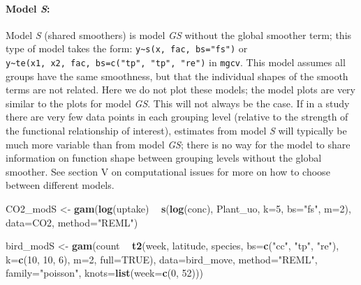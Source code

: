 \documentclass[12pt]{article}
\newenvironment{Shaded}{\begin{snugshade}}{\end{snugshade}}
\newcommand{\KeywordTok}[1]{\textcolor[rgb]{0.13,0.29,0.53}{\textbf{#1}}}
\newcommand{\DataTypeTok}[1]{\textcolor[rgb]{0.13,0.29,0.53}{#1}}
\newcommand{\DecValTok}[1]{\textcolor[rgb]{0.00,0.00,0.81}{#1}}
\newcommand{\StringTok}[1]{\textcolor[rgb]{0.31,0.60,0.02}{#1}}
\newcommand{\OtherTok}[1]{\textcolor[rgb]{0.56,0.35,0.01}{#1}}
\newcommand{\OperatorTok}[1]{\textcolor[rgb]{0.81,0.36,0.00}{\textbf{#1}}}
\newcommand{\NormalTok}[1]{#1}
\let\oldparagraph\paragraph
\renewcommand{\paragraph}[1]{\oldparagraph{#1}\mbox{}}
\begin{document}
\paragraph{\texorpdfstring{Model \emph{S}:}{Model S:}}\label{model-s}

Model \emph{S} (shared smoothers) is model \emph{GS} without the global
smoother term; this type of model takes the form:
\texttt{y\textasciitilde{}s(x,\ fac,\ bs="fs")} or
\texttt{y\textasciitilde{}te(x1,\ x2,\ fac,\ bs=c("tp",\ "tp",\ "re")}
in \texttt{mgcv}. This model assumes all groups have the same
smoothness, but that the individual shapes of the smooth terms are not
related. Here we do not plot these models; the model plots are very
similar to the plots for model \emph{GS}. This will not always be the
case. If in a study there are very few data points in each grouping
level (relative to the strength of the functional relationship of
interest), estimates from model \emph{S} will typically be much more
variable than from model \emph{GS}; there is no way for the model to
share information on function shape between grouping levels without the
global smoother. See section V on computational issues for more on how
to choose between different models.

\begin{Shaded}
\begin{Highlighting}[]
\NormalTok{CO2_modS <-}\StringTok{ }\KeywordTok{gam}\NormalTok{(}\KeywordTok{log}\NormalTok{(uptake) }\OperatorTok{~}\StringTok{ }\KeywordTok{s}\NormalTok{(}\KeywordTok{log}\NormalTok{(conc), Plant_uo, }\DataTypeTok{k=}\DecValTok{5}\NormalTok{, }\DataTypeTok{bs=}\StringTok{"fs"}\NormalTok{, }\DataTypeTok{m=}\DecValTok{2}\NormalTok{),}
                \DataTypeTok{data=}\NormalTok{CO2, }\DataTypeTok{method=}\StringTok{"REML"}\NormalTok{)}

\NormalTok{bird_modS <-}\StringTok{ }\KeywordTok{gam}\NormalTok{(count }\OperatorTok{~}\StringTok{ }\KeywordTok{t2}\NormalTok{(week, latitude, species, }\DataTypeTok{bs=}\KeywordTok{c}\NormalTok{(}\StringTok{"cc"}\NormalTok{, }\StringTok{"tp"}\NormalTok{, }\StringTok{"re"}\NormalTok{),}
                            \DataTypeTok{k=}\KeywordTok{c}\NormalTok{(}\DecValTok{10}\NormalTok{, }\DecValTok{10}\NormalTok{, }\DecValTok{6}\NormalTok{), }\DataTypeTok{m=}\DecValTok{2}\NormalTok{, }\DataTypeTok{full=}\OtherTok{TRUE}\NormalTok{),}
                 \DataTypeTok{data=}\NormalTok{bird_move, }\DataTypeTok{method=}\StringTok{"REML"}\NormalTok{, }\DataTypeTok{family=}\StringTok{"poisson"}\NormalTok{,}
                 \DataTypeTok{knots=}\KeywordTok{list}\NormalTok{(}\DataTypeTok{week=}\KeywordTok{c}\NormalTok{(}\DecValTok{0}\NormalTok{, }\DecValTok{52}\NormalTok{)))}
\end{Highlighting}
\end{Shaded}
\end{document}
